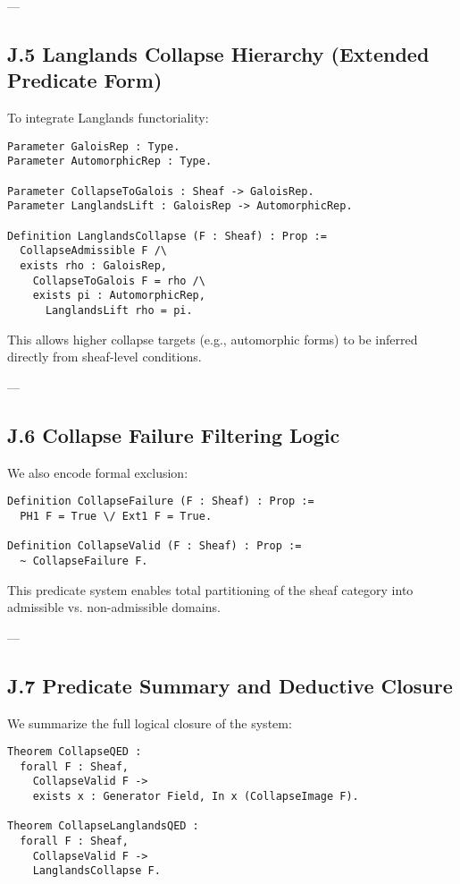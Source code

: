 \documentclass[11pt]{article}
\begin{document}
---

\subsection*{J.5 Langlands Collapse Hierarchy (Extended Predicate Form)}

To integrate Langlands functoriality:

\begin{lstlisting}[language=Coq, caption={Coq: Langlands Collapse Predicate}]
Parameter GaloisRep : Type.
Parameter AutomorphicRep : Type.

Parameter CollapseToGalois : Sheaf -> GaloisRep.
Parameter LanglandsLift : GaloisRep -> AutomorphicRep.

Definition LanglandsCollapse (F : Sheaf) : Prop :=
  CollapseAdmissible F /\
  exists rho : GaloisRep,
    CollapseToGalois F = rho /\
    exists pi : AutomorphicRep,
      LanglandsLift rho = pi.
\end{lstlisting}

This allows higher collapse targets (e.g., automorphic forms) to be inferred directly from sheaf-level conditions.

---

\subsection*{J.6 Collapse Failure Filtering Logic}

We also encode formal exclusion:

\begin{lstlisting}[language=Coq, caption={Coq: Collapse Failure Predicate}]
Definition CollapseFailure (F : Sheaf) : Prop :=
  PH1 F = True \/ Ext1 F = True.

Definition CollapseValid (F : Sheaf) : Prop :=
  ~ CollapseFailure F.
\end{lstlisting}

This predicate system enables total partitioning of the sheaf category into admissible vs. non-admissible domains.

---

\subsection*{J.7 Predicate Summary and Deductive Closure}

We summarize the full logical closure of the system:

\begin{lstlisting}[language=Coq, caption={Coq: Global Collapse QED Inference}]
Theorem CollapseQED :
  forall F : Sheaf,
    CollapseValid F ->
    exists x : Generator Field, In x (CollapseImage F).

Theorem CollapseLanglandsQED :
  forall F : Sheaf,
    CollapseValid F ->
    LanglandsCollapse F.
\end{lstlisting}
\end{document}

